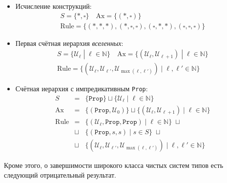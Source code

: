 \begin{itemize}
    \item Исчисление конструкций:
        \[\begin{array}{c}
            S=\{*,\square\}
            \quad \mathrm{Ax}=\{(*,\square)\}
            \\ \mathrm{Rule}=\{
                (*,*,*),(*,\square,\square),
                (\square,*,*),(\square,\square,\square)
            \}
        \end{array}\]
    \item Первая счётная иерархия \textit{вселенных}:
        \[\begin{array}{c}
            S=\{\mathcal{U}_\ell\;|\;\ell\in\mathbb{N}\}
            \quad \mathrm{Ax}=\{
                (\mathcal{U}_\ell,\mathcal{U}_{\ell+1})
                \;|\;\ell\in\mathbb{N}
            \}
            \\ \mathrm{Rule}=\{
                (\mathcal{U}_\ell, \mathcal{U}_{\ell'},
                \mathcal{U}_{\max(\ell,\ell')}) \;|\;
                \ell,\ell'\in\mathbb{N}
            \}
        \end{array}\]
    \item Счётная иерархия с импредикативным
        \texttt{Prop}:
        \[\begin{array}{rcl}
            S &=&\{\mathtt{Prop}\}\sqcup
            \{\mathcal{U}_\ell\;|\;\ell\in\mathbb{N}\}
            \\ \mathrm{Ax} &=&
            \{(\mathtt{Prop},\mathcal{U}_0)
            \}\sqcup\{
                (\mathcal{U}_\ell,\mathcal{U}_{\ell+1})
                \;|\;\ell\in\mathbb{N}
            \}
            \\ \mathrm{Rule} &=&\{
                (\mathcal{U}_\ell,\mathtt{Prop},
                \mathtt{Prop}) \;|\;
                \ell\in\mathbb{N}
            \} \;\sqcup
            \\ & \sqcup & \{
                (\mathtt{Prop}, s, s) \;|\; s\in S
            \} \;\sqcup
            \\ & \sqcup & \{
                (\mathcal{U}_\ell, \mathcal{U}_{\ell'},
                \mathcal{U}_{\max(\ell,\ell')}) \;|\;
                \ell,\ell'\in\mathbb{N}
            \}
        \end{array}\]
\end{itemize}

Кроме этого, о завершимости широкого класса чистых
систем типов есть следующий отрицательный результат.

